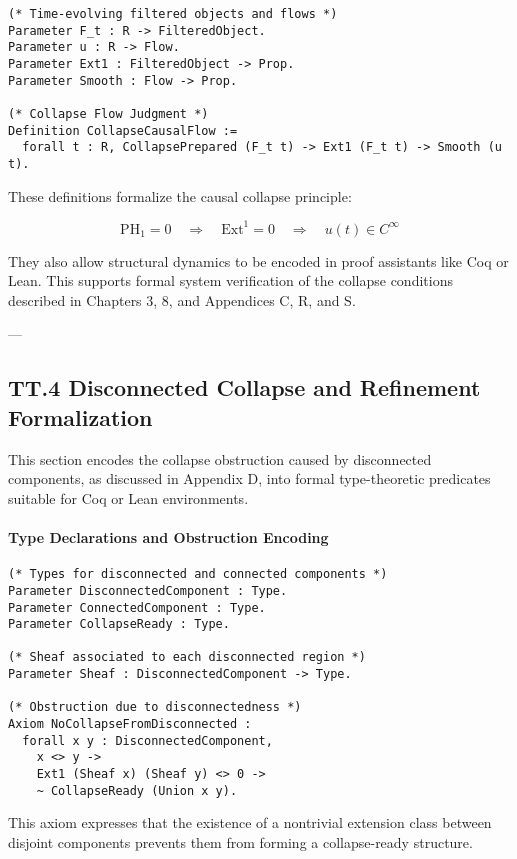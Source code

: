 \documentclass[11pt]{article}
\begin{document}
{\begin{lstlisting}[language=Coq]
(* Time-evolving filtered objects and flows *)
Parameter F_t : R -> FilteredObject.
Parameter u : R -> Flow.
Parameter Ext1 : FilteredObject -> Prop.
Parameter Smooth : Flow -> Prop.

(* Collapse Flow Judgment *)
Definition CollapseCausalFlow :=
  forall t : R, CollapsePrepared (F_t t) -> Ext1 (F_t t) -> Smooth (u t).
\end{lstlisting}

These definitions formalize the causal collapse principle:

\[
\mathrm{PH}_1 = 0 \quad \Rightarrow \quad \mathrm{Ext}^1 = 0 \quad \Rightarrow \quad u(t) \in C^\infty
\]

They also allow structural dynamics to be encoded in proof assistants like Coq or Lean.  
This supports formal system verification of the collapse conditions described in Chapters 3, 8, and Appendices C, R, and S.

---

\subsection*{TT.4 Disconnected Collapse and Refinement Formalization}

This section encodes the collapse obstruction caused by disconnected components,  
as discussed in Appendix D, into formal type-theoretic predicates suitable for Coq or Lean environments.

\paragraph{Type Declarations and Obstruction Encoding}

\begin{lstlisting}[language=Coq]
(* Types for disconnected and connected components *)
Parameter DisconnectedComponent : Type.
Parameter ConnectedComponent : Type.
Parameter CollapseReady : Type.

(* Sheaf associated to each disconnected region *)
Parameter Sheaf : DisconnectedComponent -> Type.

(* Obstruction due to disconnectedness *)
Axiom NoCollapseFromDisconnected :
  forall x y : DisconnectedComponent,
    x <> y ->
    Ext1 (Sheaf x) (Sheaf y) <> 0 ->
    ~ CollapseReady (Union x y).
\end{lstlisting}

This axiom expresses that the existence of a nontrivial extension class between disjoint components  
prevents them from forming a collapse-ready structure.

}
\end{document}
